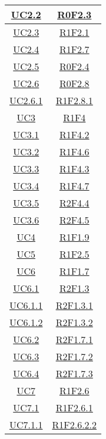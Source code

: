 \begin{longtable}{|c|c|}
\hline
\hyperlink{UC2.2}{UC2.2} & \hyperlink{R0F2.3}{R0F2.3}\\
\hline
\hyperlink{UC2.3}{UC2.3} & \hyperlink{R1F2.1}{R1F2.1}\\
\hline
\hyperlink{UC2.4}{UC2.4} & \hyperlink{R1F2.7}{R1F2.7}\\
\hline
\hyperlink{UC2.5}{UC2.5} & \hyperlink{R0F2.4}{R0F2.4}\\
\hline
\hyperlink{UC2.6}{UC2.6} & \hyperlink{R0F2.8}{R0F2.8}\\
\hline
\hyperlink{UC2.6.1}{UC2.6.1} & \hyperlink{R1F2.8.1}{R1F2.8.1}\\
\hline
\hyperlink{UC3}{UC3} & \hyperlink{R1F4}{R1F4}\\
\hline
\hyperlink{UC3.1}{UC3.1} & \hyperlink{R1F4.2}{R1F4.2}\\
\hline
\hyperlink{UC3.2}{UC3.2} & \hyperlink{R1F4.6}{R1F4.6}\\
\hline
\hyperlink{UC3.3}{UC3.3} & \hyperlink{R1F4.3}{R1F4.3}\\
\hline
\hyperlink{UC3.4}{UC3.4} & \hyperlink{R1F4.7}{R1F4.7}\\
\hline
\hyperlink{UC3.5}{UC3.5} & \hyperlink{R2F4.4}{R2F4.4}\\
\hline
\hyperlink{UC3.6}{UC3.6} & \hyperlink{R2F4.5}{R2F4.5}\\
\hline
\hyperlink{UC4}{UC4} & \hyperlink{R1F1.9}{R1F1.9}\\
\hline
\hyperlink{UC5}{UC5} & \hyperlink{R1F2.5}{R1F2.5}\\
\hline
\hyperlink{UC6}{UC6} & \hyperlink{R1F1.7}{R1F1.7}\\
\hline
\hyperlink{UC6.1}{UC6.1} & \hyperlink{R2F1.3}{R2F1.3}\\
\hline
\hyperlink{UC6.1.1}{UC6.1.1} & \hyperlink{R2F1.3.1}{R2F1.3.1}\\
\hline
\hyperlink{UC6.1.2}{UC6.1.2} & \hyperlink{R2F1.3.2}{R2F1.3.2}\\
\hline
\hyperlink{UC6.2}{UC6.2} & \hyperlink{R2F1.7.1}{R2F1.7.1}\\
\hline
\hyperlink{UC6.3}{UC6.3} & \hyperlink{R2F1.7.2}{R2F1.7.2}\\
\hline
\hyperlink{UC6.4}{UC6.4} & \hyperlink{R2F1.7.3}{R2F1.7.3}\\
\hline
\hyperlink{UC7}{UC7} & \hyperlink{R1F2.6}{R1F2.6}\\
\hline
\hyperlink{UC7.1}{UC7.1} & \hyperlink{R1F2.6.1}{R1F2.6.1}\\
\hline
\hyperlink{UC7.1.1}{UC7.1.1} & \hyperlink{R1F2.6.2.2}{R1F2.6.2.2}\\

\end{longtable}
